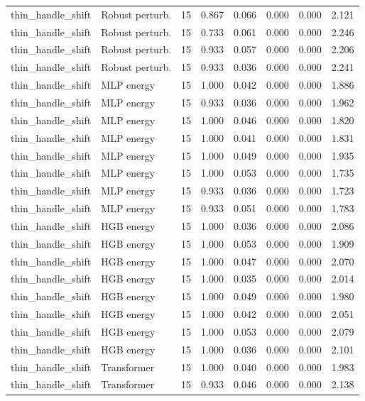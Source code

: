 {\begin{longtable}{llrrrrrr}
thin\_handle\_shift & Robust perturb. & 15 & 0.867 & 0.066 & 0.000 & 0.000 & 2.121 \\
thin\_handle\_shift & Robust perturb. & 15 & 0.733 & 0.061 & 0.000 & 0.000 & 2.246 \\
thin\_handle\_shift & Robust perturb. & 15 & 0.933 & 0.057 & 0.000 & 0.000 & 2.206 \\
thin\_handle\_shift & Robust perturb. & 15 & 0.933 & 0.036 & 0.000 & 0.000 & 2.241 \\
thin\_handle\_shift & MLP energy & 15 & 1.000 & 0.042 & 0.000 & 0.000 & 1.886 \\
thin\_handle\_shift & MLP energy & 15 & 0.933 & 0.036 & 0.000 & 0.000 & 1.962 \\
thin\_handle\_shift & MLP energy & 15 & 1.000 & 0.046 & 0.000 & 0.000 & 1.820 \\
thin\_handle\_shift & MLP energy & 15 & 1.000 & 0.041 & 0.000 & 0.000 & 1.831 \\
thin\_handle\_shift & MLP energy & 15 & 1.000 & 0.049 & 0.000 & 0.000 & 1.935 \\
thin\_handle\_shift & MLP energy & 15 & 1.000 & 0.053 & 0.000 & 0.000 & 1.735 \\
thin\_handle\_shift & MLP energy & 15 & 0.933 & 0.036 & 0.000 & 0.000 & 1.723 \\
thin\_handle\_shift & MLP energy & 15 & 0.933 & 0.051 & 0.000 & 0.000 & 1.783 \\
thin\_handle\_shift & HGB energy & 15 & 1.000 & 0.036 & 0.000 & 0.000 & 2.086 \\
thin\_handle\_shift & HGB energy & 15 & 1.000 & 0.053 & 0.000 & 0.000 & 1.909 \\
thin\_handle\_shift & HGB energy & 15 & 1.000 & 0.047 & 0.000 & 0.000 & 2.070 \\
thin\_handle\_shift & HGB energy & 15 & 1.000 & 0.035 & 0.000 & 0.000 & 2.014 \\
thin\_handle\_shift & HGB energy & 15 & 1.000 & 0.049 & 0.000 & 0.000 & 1.980 \\
thin\_handle\_shift & HGB energy & 15 & 1.000 & 0.042 & 0.000 & 0.000 & 2.051 \\
thin\_handle\_shift & HGB energy & 15 & 1.000 & 0.053 & 0.000 & 0.000 & 2.079 \\
thin\_handle\_shift & HGB energy & 15 & 1.000 & 0.036 & 0.000 & 0.000 & 2.101 \\
thin\_handle\_shift & Transformer & 15 & 1.000 & 0.040 & 0.000 & 0.000 & 1.983 \\
thin\_handle\_shift & Transformer & 15 & 0.933 & 0.046 & 0.000 & 0.000 & 2.138 \\

\end{longtable}}

